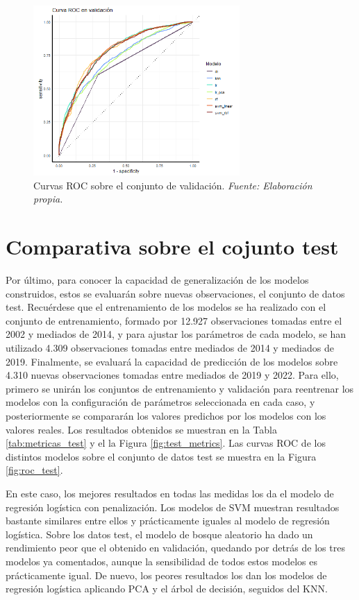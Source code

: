 \documentclass[12pt,a4paper,]{book}
\numberwithin{dummy}{section}
\theoremstyle{ocrenumbox}
\theoremstyle{blacknumex}
\theoremstyle{blacknumbox}
\theoremstyle{ocrenum}
\theoremstyle{ocrenum}
\begin{document}
\begin{figure}[h]
\centering
\includegraphics[width =0.7\textwidth]{graficos/roc_validation.png}
\caption[Curvas ROC sobre el conjunto de validación]{Curvas ROC sobre el conjunto de validación. \it Fuente: Elaboración propia.}
\label{fig:roc_validation}
\end{figure}

\hypertarget{comparativa-sobre-el-cojunto-test}{%
\section{Comparativa sobre el cojunto
test}\label{comparativa-sobre-el-cojunto-test}}

Por último, para conocer la capacidad de generalización de los modelos
construidos, estos se evaluarán sobre nuevas observaciones, el conjunto
de datos test. Recuérdese que el entrenamiento de los modelos se ha
realizado con el conjunto de entrenamiento, formado por 12.927
observaciones tomadas entre el 2002 y mediados de 2014, y para ajustar
los parámetros de cada modelo, se han utilizado 4.309 observaciones
tomadas entre mediados de 2014 y mediados de 2019. Finalmente, se
evaluará la capacidad de predicción de los modelos sobre 4.310 nuevas
observaciones tomadas entre mediados de 2019 y 2022. Para ello, primero
se unirán los conjuntos de entrenamiento y validación para reentrenar
los modelos con la configuración de parámetros seleccionada en cada
caso, y posteriormente se compararán los valores predichos por los
modelos con los valores reales. Los resultados obtenidos se muestran en
la Tabla \ref{tab:metricas_test} y el la Figura \ref{fig:test_metrics}.
Las curvas ROC de los distintos modelos sobre el conjunto de datos test
se muestra en la Figura \ref{fig:roc_test}.

En este caso, los mejores resultados en todas las medidas los da el
modelo de regresión logística con penalización. Los modelos de SVM
muestran resultados bastante similares entre ellos y prácticamente
iguales al modelo de regresión logística. Sobre los datos test, el
modelo de bosque aleatorio ha dado un rendimiento peor que el obtenido
en validación, quedando por detrás de los tres modelos ya comentados,
aunque la sensibilidad de todos estos modelos es prácticamente igual. De
nuevo, los peores resultados los dan los modelos de regresión logística
aplicando PCA y el árbol de decisión, seguidos del KNN.
\end{document}
